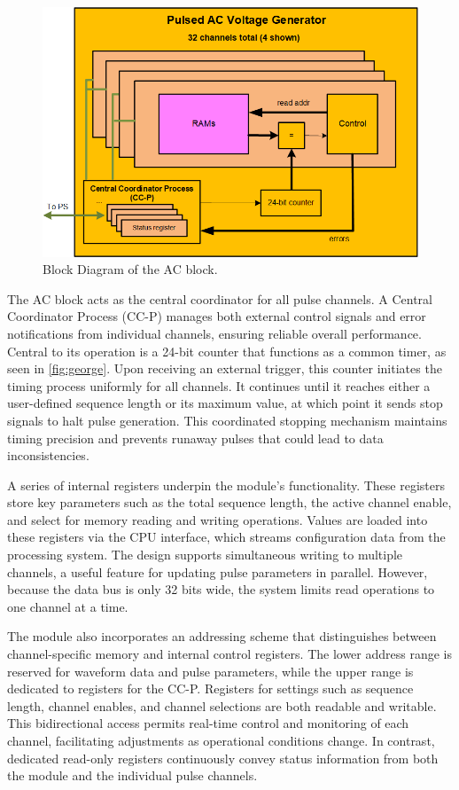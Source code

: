 \begin{figure}[h]
    \centering
    \includegraphics[width=0.8\linewidth]{figures/5.3.png}
    \caption{Block Diagram of the AC block.}
    \label{fig:george}
\end{figure}
The AC block acts as the central coordinator for all pulse channels. A Central Coordinator Process (CC-P) manages both external control signals and error notifications from individual channels, ensuring reliable overall performance. Central to its operation is a 24-bit counter that functions as a common timer, as seen in \autoref{fig:george}. Upon receiving an external trigger, this counter initiates the timing process uniformly for all channels. It continues until it reaches either a user-defined sequence length or its maximum value, at which point it sends stop signals to halt pulse generation. This coordinated stopping mechanism maintains timing precision and prevents runaway pulses that could lead to data inconsistencies.

A series of internal registers underpin the module's functionality. These registers store key parameters such as the total sequence length, the active channel enable, and select for memory reading and writing operations. Values are loaded into these registers via the CPU interface, which streams configuration data from the processing system. The design supports simultaneous writing to multiple channels, a useful feature for updating pulse parameters in parallel. However, because the data bus is only 32 bits wide, the system limits read operations to one channel at a time.

The module also incorporates an addressing scheme that distinguishes between channel-specific memory and internal control registers. The lower address range is reserved for waveform data and pulse parameters, while the upper range is dedicated to registers for the CC-P. Registers for settings such as sequence length, channel enables, and channel selections are both readable and writable. This bidirectional access permits real-time control and monitoring of each channel, facilitating adjustments as operational conditions change. In contrast, dedicated read-only registers continuously convey status information from both the module and the individual pulse channels.


